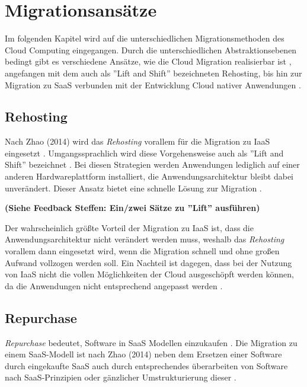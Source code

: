 \section{Migrationsansätze}
\label{sec:migrationsansaetze}

Im folgenden Kapitel wird auf die unterschiedlichen Migrationsmethoden des Cloud Computing eingegangen. Durch die unterschiedlichen Abstraktionsebenen bedingt gibt es verschiedene Ansätze, wie die Cloud Migration realisierbar ist \cite[Vgl.][S. 226]{Surianarayanan2019}, angefangen mit dem auch als ''Lift and Shift'' bezeichneten Rehosting, bis hin zur Migration zu \ac{SaaS} verbunden mit der Entwicklung Cloud nativer Anwendungen \cite[Vgl.][S. 144]{Zhao2014}.

\subsection{Rehosting}
Nach Zhao (2014) wird das \textit{Rehosting} vorallem für die Migration zu \ac{IaaS} eingesetzt \cite[Vgl.][S. 144]{Zhao2014}. Umgangssprachlich wird diese Vorgehensweise auch als ''Lift and Shift'' bezeichnet \cite[Vgl.][]{NetApp}. Bei diesen Strategien werden Anwendungen lediglich auf einer anderen Hardwareplattform installiert, die Anwendungsarchitektur bleibt dabei unverändert. Dieser Ansatz bietet eine schnelle Lösung zur Migration \cite[Vgl.][]{CIO}.

\textbf{(Siehe Feedback Steffen: Ein/zwei Sätze zu ''Lift'' ausführen)}

Der wahrscheinlich größte Vorteil der Migration zu \ac{IaaS} ist, dass die Anwendungsarchitektur nicht verändert werden muss, weshalb das \textit{Rehosting} vorallem dann eingesetzt wird, wenn die Migration schnell und ohne großen Aufwand vollzogen werden soll. Ein Nachteil ist dagegen, dass bei der Nutzung von \ac{IaaS} nicht die vollen Möglichkeiten der Cloud ausgeschöpft werden können, da die Anwendungen nicht entsprechend angepasst werden \cite[Vgl.][]{CIO}.

\subsection{Repurchase}
\textit{Repurchase} bedeutet, Software in \ac{SaaS} Modellen einzukaufen \cite[Vgl.][S. 2]{Ahmad2018}. Die Migration zu einem \ac{SaaS}-Modell ist nach Zhao (2014) neben dem Ersetzen einer Software durch eingekaufte \acs{SaaS} auch durch entsprechendes überarbeiten von Software nach \ac{SaaS}-Prinzipien oder gänzlicher Umstrukturierung dieser \cite[Vgl.][S. 144]{Zhao2014}. 


